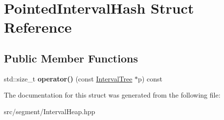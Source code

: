 \hypertarget{structPointedIntervalHash}{}\section{Pointed\+Interval\+Hash Struct Reference}
\label{structPointedIntervalHash}
\subsection*{Public Member Functions}
\begin{DoxyCompactItemize}
\item 
\mbox{\label{structPointedIntervalHash_a58a0ee22e288bea39121cb435c924740}} 
std\+::size\+\_\+t {\bfseries operator()} (const \mbox{\hyperlink{classIntervalTree}{Interval\+Tree}} $\ast$p) const
\end{DoxyCompactItemize}


The documentation for this struct was generated from the following file\+:\begin{DoxyCompactItemize}
\item 
src/segment/Interval\+Heap.\+hpp\end{DoxyCompactItemize}
